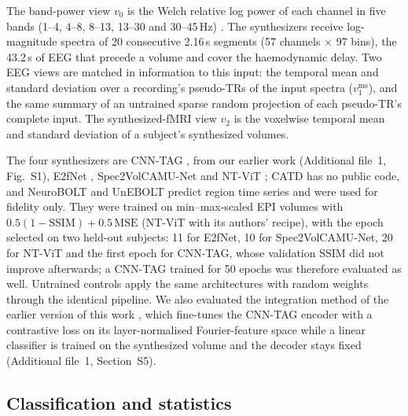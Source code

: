 \documentclass[pdflatex,referee,sn-basic]{sn-jnl}%
\begin{document}
The band-power view $v_0$ is the Welch relative log power of each channel in five bands (1--4, 4--8, 8--13, 13--30 and 30--45\,Hz) \cite{roach2008event,bates2009low}. The synthesizers receive log-magnitude spectra of 20 consecutive 2.16\,s segments (57 channels $\times$ 97 bins), the 43.2\,s of EEG that precede a volume and cover the haemodynamic delay. Two EEG views are matched in information to this input: the temporal mean and standard deviation over a recording's pseudo-TRs of the input spectra ($v_1^{\mathrm{ms}}$), and the same summary of an untrained sparse random projection \cite{li2006sparse} of each pseudo-TR's complete input. The synthesized-fMRI view $v_2$ is the voxelwise temporal mean and standard deviation of a subject's synthesized volumes.

The four synthesizers are CNN-TAG \cite{calhas2022eeg}, from our earlier work (Additional file~1, Fig.~S1), E2fNet \cite{roos2025brainwaves}, Spec2VolCAMU-Net \cite{he2025spec2vol} and NT-ViT \cite{lanzino2024ntvit}; CATD \cite{yao2025catd} has no public code, and NeuroBOLT and UnEBOLT \cite{li2024neurobolt,li2026unebolt} predict region time series and were used for fidelity only. They were trained on min--max-scaled EPI volumes with $0.5(1-\mathrm{SSIM})+0.5\,\mathrm{MSE}$ (NT-ViT with its authors' recipe), with the epoch selected on two held-out subjects: 11 for E2fNet, 10 for Spec2VolCAMU-Net, 20 for NT-ViT and the first epoch for CNN-TAG, whose validation SSIM did not improve afterwards; a CNN-TAG trained for 50 epochs was therefore evaluated as well. Untrained controls apply the same architectures with random weights through the identical pipeline. We also evaluated the integration method of the earlier version of this work \cite{calhas2023medrxiv}, which fine-tunes the CNN-TAG encoder with a contrastive loss on its layer-normalised Fourier-feature space while a linear classifier is trained on the synthesized volume and the decoder stays fixed (Additional file~1, Section~S5).

\subsection{Classification and statistics}\label{section:setting}
\end{document}
